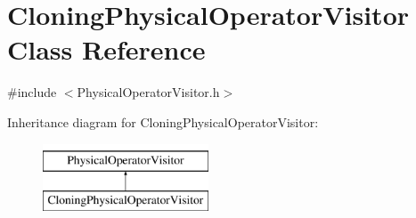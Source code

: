 \hypertarget{class_cloning_physical_operator_visitor}{\section{Cloning\+Physical\+Operator\+Visitor Class Reference}
\label{class_cloning_physical_operator_visitor}
}


{\ttfamily \#include $<$Physical\+Operator\+Visitor.\+h$>$}

Inheritance diagram for Cloning\+Physical\+Operator\+Visitor\+:\begin{figure}[H]
\begin{center}
\leavevmode
\includegraphics[height=2.000000cm]{class_cloning_physical_operator_visitor}
\end{center}
\end{figure}
